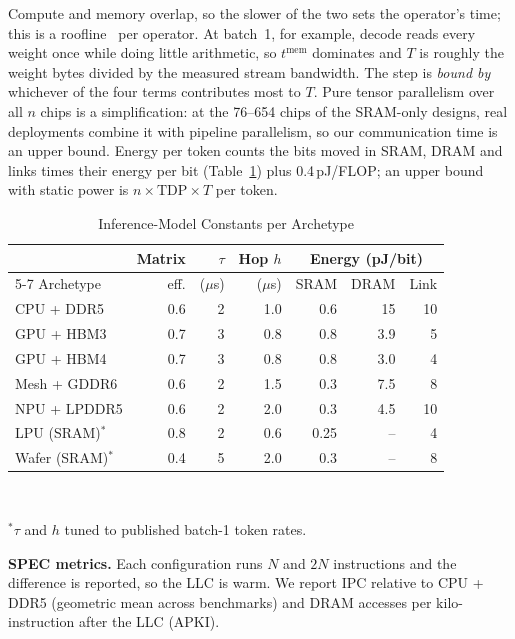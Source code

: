 \documentclass[conference]{IEEEtran}
\begin{document}
Compute and memory overlap, so the slower of the two sets the operator's time; this is a roofline~\cite{williams2009} per operator. At batch~1, for example, decode reads every weight once while doing little arithmetic, so $t^{\mathrm{mem}}$ dominates and $T$ is roughly the weight bytes divided by the measured stream bandwidth. The step is \emph{bound by} whichever of the four terms contributes most to $T$. Pure tensor parallelism over all $n$ chips is a simplification: at the 76--654 chips of the SRAM-only designs, real deployments combine it with pipeline parallelism, so our communication time is an upper bound. Energy per token counts the bits moved in SRAM, DRAM and links times their energy per bit (Table~\ref{tab:const}) plus 0.4\,pJ/FLOP; an upper bound with static power is $n\times\mathrm{TDP}\times T$ per token.

\begin{table}[t]
\caption{Inference-Model Constants per Archetype}
\label{tab:const}
\centering
\footnotesize
\setlength{\tabcolsep}{3pt}
\begin{tabular}{@{}lrrrrrr@{}}
\toprule
 & Matrix & $\tau$ & Hop $h$ & \multicolumn{3}{c}{Energy (pJ/bit)}\\
\cmidrule{5-7}
Archetype & eff. & ($\mu$s) & ($\mu$s) & SRAM & DRAM & Link\\
\midrule
CPU + DDR5 & 0.6 & 2 & 1.0 & 0.6 & 15 & 10\\
GPU + HBM3 & 0.7 & 3 & 0.8 & 0.8 & 3.9 & 5\\
GPU + HBM4 & 0.7 & 3 & 0.8 & 0.8 & 3.0 & 4\\
Mesh + GDDR6 & 0.6 & 2 & 1.5 & 0.3 & 7.5 & 8\\
NPU + LPDDR5 & 0.6 & 2 & 2.0 & 0.3 & 4.5 & 10\\
LPU (SRAM)$^\ast$ & 0.8 & 2 & 0.6 & 0.25 & -- & 4\\
Wafer (SRAM)$^\ast$ & 0.4 & 5 & 2.0 & 0.3 & -- & 8\\
\bottomrule
\end{tabular}\\[2pt]
\raggedright\scriptsize $^\ast\tau$ and $h$ tuned to published batch-1 token rates.
\end{table}

\textbf{SPEC metrics.} Each configuration runs $N$ and $2N$ instructions and the difference is reported, so the LLC is warm. We report IPC relative to CPU + DDR5 (geometric mean across benchmarks) and DRAM accesses per kilo-instruction after the LLC (APKI).

\end{document}
